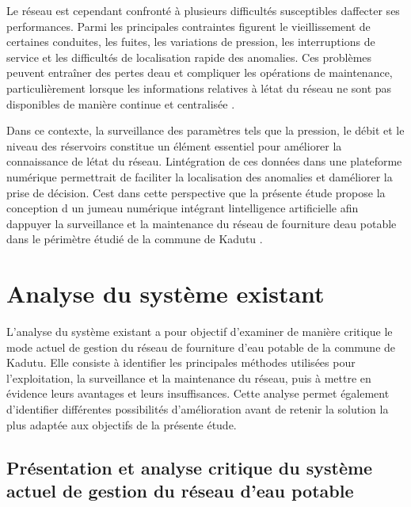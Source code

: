 Le réseau est cependant confronté à plusieurs difficultés susceptibles
d\textquotesingle affecter ses performances. Parmi les principales
contraintes figurent le vieillissement de certaines conduites, les
fuites, les variations de pression, les interruptions de service et les
difficultés de localisation rapide des anomalies. Ces problèmes peuvent
entraîner des pertes d\textquotesingle eau et compliquer les opérations
de maintenance, particulièrement lorsque les informations relatives à
l\textquotesingle état du réseau ne sont pas disponibles de manière
continue et centralisée \cite{ref92}.

Dans ce contexte, la surveillance des paramètres tels que la pression,
le débit et le niveau des réservoirs constitue un élément essentiel pour
améliorer la connaissance de l\textquotesingle état du réseau.
L\textquotesingle intégration de ces données dans une plateforme
numérique permettrait de faciliter la localisation des anomalies et
d\quotesingle améliorer la prise de décision. C\textquotesingle est
dans cette perspective que la présente étude propose la conception d\textquotesingle
un jumeau numérique intégrant l\textquotesingle intelligence
artificielle afin d\textquotesingle appuyer la surveillance et la
maintenance du réseau de fourniture d\textquotesingle eau potable dans
le périmètre étudié de la commune de Kadutu \cite{ref20}.

\section{Analyse du système existant}
\label{analyse-du-systuxe8me-existant}

L'analyse du système existant a pour objectif d'examiner de manière
critique le mode actuel de gestion du réseau de fourniture d'eau
potable de la commune de Kadutu. Elle consiste à identifier les
principales méthodes utilisées pour l'exploitation, la surveillance et
la maintenance du réseau, puis à mettre en évidence leurs avantages et
leurs insuffisances. Cette analyse permet également d'identifier
différentes possibilités d'amélioration avant de retenir la solution
la plus adaptée aux objectifs de la présente étude.

\subsection{Présentation et analyse critique du système actuel de gestion
	du réseau d'eau potable}
\label{presentation-et-analyse-critique-du-systeme-actuel}

